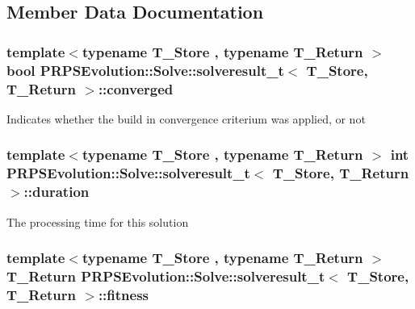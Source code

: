 \subsection{Member Data Documentation}
\hypertarget{struct_p_r_p_s_evolution_1_1_solve_1_1solveresult__t_abf29e453e9bbc93551899cfa3c4a1578}{
\subsubsection[{converged}]{\setlength{\rightskip}{0pt plus 5cm}template$<$typename T\-\_\-\-Store , typename T\-\_\-\-Return $>$ bool {\bf P\-R\-P\-S\-Evolution\-::\-Solve\-::solveresult\-\_\-t}$<$ T\-\_\-\-Store, T\-\_\-\-Return $>$\-::converged}}\label{struct_p_r_p_s_evolution_1_1_solve_1_1solveresult__t_abf29e453e9bbc93551899cfa3c4a1578}
Indicates whether the build in convergence criterium was applied, or not \hypertarget{struct_p_r_p_s_evolution_1_1_solve_1_1solveresult__t_a1dccd3f663f1deac187652edab66000a}{
\subsubsection[{duration}]{\setlength{\rightskip}{0pt plus 5cm}template$<$typename T\-\_\-\-Store , typename T\-\_\-\-Return $>$ int {\bf P\-R\-P\-S\-Evolution\-::\-Solve\-::solveresult\-\_\-t}$<$ T\-\_\-\-Store, T\-\_\-\-Return $>$\-::duration}}\label{struct_p_r_p_s_evolution_1_1_solve_1_1solveresult__t_a1dccd3f663f1deac187652edab66000a}
The processing time for this solution \hypertarget{struct_p_r_p_s_evolution_1_1_solve_1_1solveresult__t_a004724c255fb599621d2085d53f3669a}{
\subsubsection[{fitness}]{\setlength{\rightskip}{0pt plus 5cm}template$<$typename T\-\_\-\-Store , typename T\-\_\-\-Return $>$ T\-\_\-\-Return {\bf P\-R\-P\-S\-Evolution\-::\-Solve\-::solveresult\-\_\-t}$<$ T\-\_\-\-Store, T\-\_\-\-Return $>$\-::fitness}}\label{struct_p_r_p_s_evolution_1_1_solve_1_1solveresult__t_a004724c255fb599621d2085d53f3669a}
